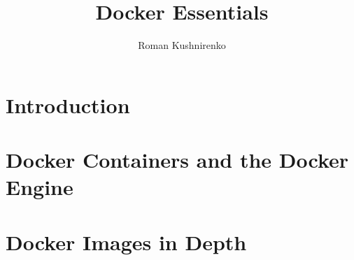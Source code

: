 \documentclass{article}
\title{Docker Essentials}
\author{Roman Kushnirenko}
\begin{document}
	\maketitle

	\section{Introduction}

	\section{Docker Containers and the Docker Engine}
	
	\section{Docker Images in Depth}
	
\end{document}
